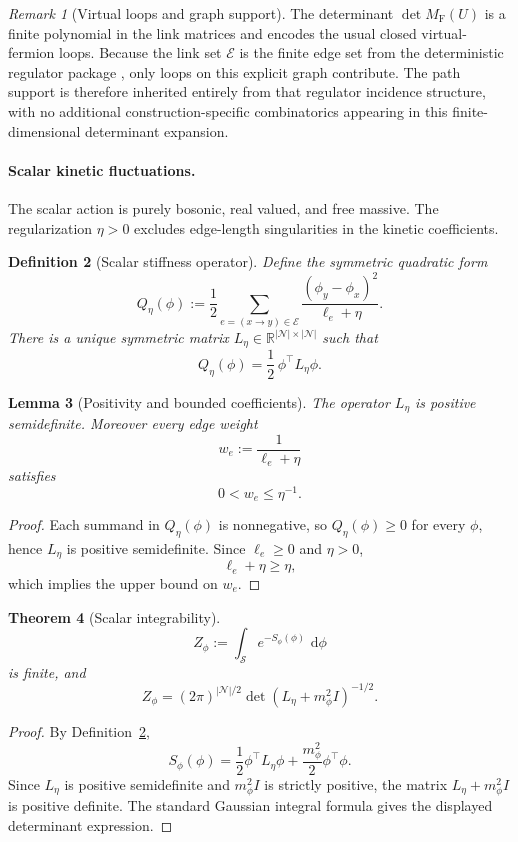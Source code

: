 \documentclass[11pt]{article}
\newtheorem{theorem}{Theorem}[section]
\newtheorem{definition}[theorem]{Definition}
\newtheorem{lemma}[theorem]{Lemma}
\theoremstyle{remark}
\newtheorem{remark}[theorem]{Remark}
\newcommand{\R}{\mathbb R}
\newcommand{\mcN}{\mathcal N}
\newcommand{\mcE}{\mathcal E}
\newcommand{\mcS}{\mathscr S}
\newcommand{\dd}{\,\mathrm d}
\begin{document}
\begin{remark}[Virtual loops and graph support]
\label{rem:fermion-loops}
The determinant $\det M_{\mathrm F}(U)$ is a finite polynomial in the link
matrices and encodes the usual closed virtual-fermion loops.  Because the link
set $\mcE$ is the finite edge set from the deterministic regulator package
\cite{continuumqft}, only loops on this explicit graph contribute.  The
path support is therefore inherited entirely from that regulator incidence
structure, with no additional construction-specific combinatorics appearing in this
finite-dimensional determinant expansion.
\end{remark}

\paragraph{Scalar kinetic fluctuations.}
The scalar action is purely bosonic, real valued, and free massive.  The
regularization $\eta>0$ excludes edge-length singularities in the kinetic
coefficients.

\begin{definition}[Scalar stiffness operator]
\label{def:scalar-operator}
Define the symmetric quadratic form
\[
Q_\eta(\phi)
:=
\frac12\sum_{e=(x\to y)\in\mcE}\frac{(\phi_y-\phi_x)^2}{\ell_e+\eta}.
\]
There is a unique symmetric matrix $L_\eta\in\R^{|\mcN|\times|\mcN|}$ such that
\[
Q_\eta(\phi)=\frac12\,\phi^\top L_\eta \phi.
\]
\end{definition}

\begin{lemma}[Positivity and bounded coefficients]
\label{lem:scalar-positive}
The operator $L_\eta$ is positive semidefinite.  Moreover every edge weight
\[
w_e:=\frac{1}{\ell_e+\eta}
\]
satisfies
\[
0<w_e\le \eta^{-1}.
\]
\end{lemma}
\begin{proof}
Each summand in $Q_\eta(\phi)$ is nonnegative, so $Q_\eta(\phi)\ge 0$ for every
$\phi$, hence $L_\eta$ is positive semidefinite.  Since $\ell_e\ge 0$ and
$\eta>0$,
\[
\ell_e+\eta\ge \eta,
\]
which implies the upper bound on $w_e$.
\end{proof}

\begin{theorem}[Scalar integrability]
\label{thm:scalar-integrable}
\[
Z_\phi
:=
\int_{\mcS}e^{-S_\phi(\phi)}\,\dd\phi
\]
is finite, and
\[
Z_\phi
=
(2\pi)^{|\mcN|/2}
\det(L_\eta+m_\phi^2 I)^{-1/2}.
\]
\end{theorem}
\begin{proof}
By Definition~\ref{def:scalar-operator},
\[
S_\phi(\phi)=\frac12\phi^\top L_\eta\phi
+\frac{m_\phi^2}{2}\phi^\top\phi.
\]
Since $L_\eta$ is positive semidefinite and $m_\phi^2 I$ is strictly positive,
the matrix $L_\eta+m_\phi^2 I$ is positive definite.  The standard Gaussian
integral formula gives the displayed determinant expression.
\end{proof}
\end{document}
